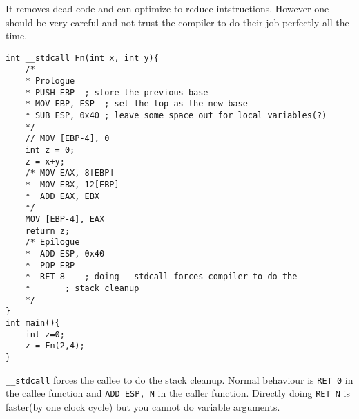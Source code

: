 \documentclass[11pt,letterpaper]{article}
\begin{document}
It removes dead code and can optimize to reduce intstructions. However one should
be very careful and not trust the compiler to do their job perfectly all the time.

\begin{verbatim}
int __stdcall Fn(int x, int y){
	/*
	* Prologue
	* PUSH EBP	; store the previous base
	* MOV EBP, ESP	; set the top as the new base
	* SUB ESP, 0x40 ; leave some space out for local variables(?)
	*/
	// MOV [EBP-4], 0
	int z = 0;
	z = x+y;
	/* MOV EAX, 8[EBP]
	*  MOV EBX, 12[EBP]
	*  ADD EAX, EBX
	*/
	MOV [EBP-4], EAX
	return z;
	/* Epilogue
	*  ADD ESP, 0x40
	*  POP EBP
	*  RET 8	; doing __stdcall forces compiler to do the 
	*		; stack cleanup
	*/
}
int main(){
	int z=0;
	z = Fn(2,4);
}
\end{verbatim}
\texttt{\_\_stdcall} forces the callee to do the stack cleanup. Normal behaviour is
\texttt{RET 0} in the callee function and \texttt{ADD ESP, N} in the caller function. Directly doing \texttt{RET N} is faster(by one clock cycle) but you cannot do
variable arguments.
\end{document}
